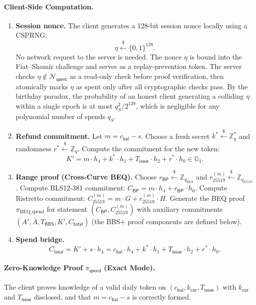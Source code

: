 \documentclass[11pt]{article}
\theoremstyle{definitionstyle}
\theoremstyle{plain}
\begin{document}
\paragraph{Client-Side Computation.}
\begin{enumerate}[leftmargin=*]
\item \textbf{Session nonce.}
  The client generates a 128-bit session nonce locally using a CSPRNG:
  \[
  \eta \xleftarrow{\$} \{0,1\}^{128}.
  \]
  No network request to the server is needed.  The nonce $\eta$ is bound into the Fiat--Shamir challenge and serves as a replay-prevention token.  The server checks $\eta \notin \mathcal{N}_{\mathsf{spent}}$ as a read-only check before proof verification, then atomically marks $\eta$ as spent only after all cryptographic checks pass.  By the birthday paradox, the probability of an honest client generating a colliding $\eta$ within a single epoch is at most $q_S^2/2^{128}$, which is negligible for any polynomial number of spends $q_S$.
\item \textbf{Refund commitment.}
  Let $m = c_{\mathsf{bal}} - s$. Choose a fresh secret $k^* \xleftarrow{\$} \mathbb{Z}_q^*$ and randomness $r^* \xleftarrow{\$} \mathbb{Z}_q$. Compute the commitment for the new token:
  \[
  K' = m \cdot h_4 + k^* \cdot h_1 + T_{\mathsf{issue}} \cdot h_2 + r^* \cdot h_0 \in \mathbb{G}_1.
  \]
\item \textbf{Range proof (Cross-Curve BEQ).}
  Choose $r_{\mathsf{BP}} \xleftarrow{\$} \mathbb{Z}_{q_{\text{BLS}}}$ and $r_{25519}^{(m)} \xleftarrow{\$} \mathbb{Z}_{q_{25519}}$.
  Compute BLS12-381 commitment: $C_{\mathsf{BP}} = m \cdot h_4 + r_{\mathsf{BP}} \cdot h_0$.
  Compute Ristretto commitment: $C_{25519}^{(m)} = m \cdot G + r_{25519}^{(m)} \cdot H$.
  Generate the BEQ proof $\pi_{\text{BEQ\_spend}}$ for statement $(C_{\mathsf{BP}}, C_{25519}^{(m)})$ with auxiliary commitments $(A', \bar{A}, T_{\mathsf{BBS}}, K', C_{\mathsf{total}})$ (the BBS+ proof components are defined below).
\item \textbf{Spend bridge.}
  \[
  C_{\mathsf{total}} = K' + s \cdot h_4 = c_{\mathsf{bal}} \cdot h_4 + k^* \cdot h_1 + T_{\mathsf{issue}} \cdot h_2 + r^* \cdot h_0.
  \]
\end{enumerate}

\paragraph{Zero-Knowledge Proof $\pi_{\mathsf{spend}}$ (Exact Mode).}
The client proves knowledge of a valid daily token on $(c_{\mathsf{bal}}, k_{\mathsf{cur}}, T_{\mathsf{issue}})$ with $k_{\mathsf{cur}}$ and $T_{\mathsf{issue}}$ disclosed, and that $m = c_{\mathsf{bal}} - s$ is correctly formed.
\end{document}
